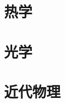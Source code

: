 \documentclass{xNoteBook}
\begin{document}

\maketitle

\frontmatter
\makesymb
\tableofcontents
\listoffigures
\listoftables

\mainmatter

\part{热学}



\part{光学}


\part{近代物理}




\appendix

\backmatter


\end{document}
